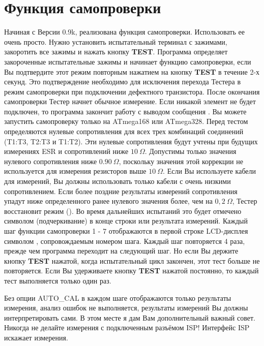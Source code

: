 
\section{Функция самопроверки}
\label{sec:selftest}
Начиная с Версии 0.9k,  реализована функция самопроверки. Использовать ее очень просто. Нужно установить 
испытательный терминал с зажимами, закоротить все зажимы и нажать кнопку \textbf{ TEST}. Программа определяет закороченные 
испытательные зажимы и начинает функцию самопроверки, если Вы подтвердите этот режим повторным нажатием на кнопку 
\textbf{ TEST} в течение 2-х секунд. Это подтверждение необходимо для исключения перехода Тестера в режим самопроверки при 
подключении дефектного транзистора. После окончания самопроверки Тестер начнет обычное измерение. Если никакой 
элемент не будет подключен, то программа закончит работу с выводом сообщения . Вы 
можете запустить самопроверку только на ATmega168 или ATmega328. Перед тестом определяются нулевые сопротивления 
для всех трех комбинаций соединений (T1:T3, T2:T3 и T1:T2). Эти нулевые сопротивления будут учтены при будущих 
измерениях ESR и сопротивлений ниже \(10~\Omega\).
Допустимы только значения нулевого сопротивления ниже \(0.90~\Omega\), поскольку значения этой коррекции
не используется для измерения резисторов выше \(10~\Omega\).
Если Вы используете кабели для измерений, Вы должны использовать только кабели с очень низкими сопротивлением.
Если более поздние результаты измерений сопротивления упадут ниже определенного ранее нулевого значения более, 
чем на \(0,2~\Omega\),
Тестер восстановит режим  (). Во время дальнейших испытаний это будет отмечено 
символом \inquotes{\_} (подчеркивание) в конце строки или результата измерений. Каждый шаг функции самопроверки 1 - 7 отображаются в первой 
строке LCD-дисплея символом , сопровождаемым номером шага. Каждый шаг повторяется 4 раза, прежде чем программа 
переходит на следующий шаг. Но если Вы держите кнопку \textbf{ TEST} нажатой, когда испытательный цикл закончен, этот тест 
больше не повторяется. Если Вы удерживаете кнопку \textbf{ TEST} нажатой  постоянно, то каждый тест выполняется только 
один раз. 

Без опции AUTO\_CAL в каждом шаге отображаются только результаты измерения, анализ ошибок не выполняется, результаты 
измерений Вы должны интерпретировать сами. В этом месте я дам Вам дополнительный важный совет. Никогда не делайте 
измерения с подключенным разъёмом ISP! Интерфейс ISP искажает измерения.
 
